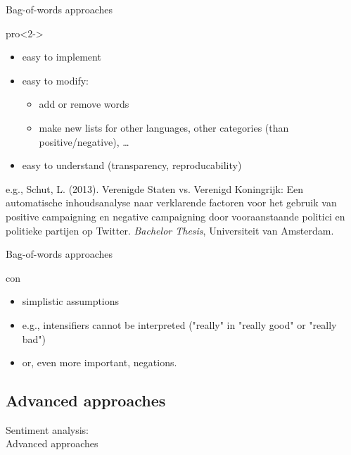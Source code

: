 \documentclass{beamer}
\begin{document}


\begin{frame}{Bag-of-words approaches}
	\begin{block}{pro}<2->
		\begin{itemize}
			\item easy to implement
			\item easy to modify:
			\begin{itemize}
				\item add or remove words
				\item make new lists for other languages, other categories (than positive/negative), \dots
			\end{itemize}
			\item easy to understand (transparency, reproducability)
		\end{itemize}
	\end{block}
	\par
	\tiny{e.g., Schut, L. (2013). Verenigde Staten vs. Verenigd Koningrijk: Een automatische inhoudsanalyse naar verklarende factoren voor het gebruik van positive campaigning en negative campaigning door vooraanstaande politici en politieke partijen op Twitter. \emph{Bachelor Thesis}, Universiteit van Amsterdam.}\\
\end{frame}



\begin{frame}{Bag-of-words approaches}
	\begin{block}{con}
		\begin{itemize}
			\item simplistic assumptions
			\item e.g., intensifiers cannot be interpreted ("really" in "really good" or "really bad")
			\item or, even more important, negations.
		\end{itemize}
	\end{block}
\end{frame}



\subsection{Advanced approaches}
\begin{frame}
	Sentiment analysis:\\
	Advanced approaches
\end{frame}
\end{document}
